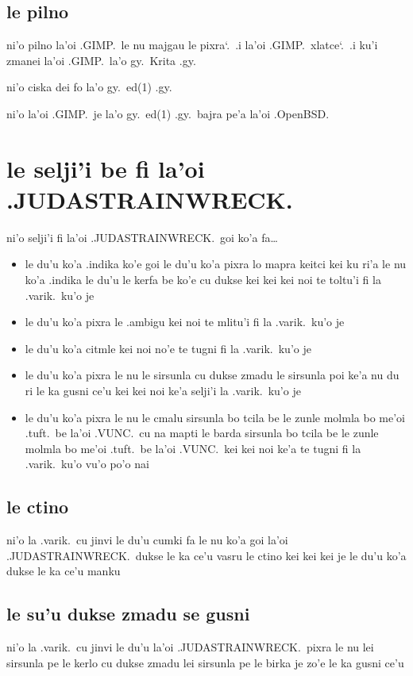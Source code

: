 \documentclass{report}
\newcommand\sds{\spacefactor\sfcode`.\ \space}
\begin{document}
\subsection{le pilno}
ni'o pilno la'oi .GIMP.\ le nu majgau le pixra\sds  .i  la'oi .GIMP.\ xlatce\sds  .i ku'i zmanei la'oi .GIMP.\ la'o gy.\ Krita  .gy.

ni'o ciska dei fo la'o gy.\ ed(1) .gy.

ni'o la'oi .GIMP.\ je la'o gy.\ ed(1) .gy.\ bajra pe'a la'oi .OpenBSD.

\section{le selji'i be fi la'oi .JUDASTRAINWRECK.}
ni'o selji'i fi la'oi .JUDASTRAINWRECK.\ goi ko'a fa\ldots
\begin{itemize}
	\item le du'u ko'a .indika ko'e goi le du'u ko'a pixra lo mapra keitci kei ku ri'a le nu ko'a .indika le du'u le kerfa be ko'e cu dukse kei kei kei noi te toltu'i fi la .varik.\ ku'o je
	\item le du'u ko'a pixra le .ambigu kei noi te mlitu'i fi la .varik.\ ku'o je
	\item le du'u ko'a citmle kei noi no'e te tugni fi la .varik.\ ku'o je
	\item le du'u ko'a pixra le nu le sirsunla cu dukse zmadu le sirsunla poi ke'a nu du ri le ka gusni ce'u kei kei noi ke'a selji'i la .varik.\ ku'o je
	\item le du'u ko'a pixra le nu le cmalu sirsunla bo tcila be le zunle molmla bo me'oi .tuft.\ be la'oi .VUNC.\ cu na mapti le barda sirsunla bo tcila be le zunle molmla bo me'oi .tuft.\ be la'oi .VUNC.\ kei kei noi ke'a te tugni fi la .varik.\ ku'o
vu'o po'o nai
\end{itemize}

\subsection{le ctino}
ni'o la .varik.\ cu jinvi le du'u cumki fa le nu ko'a goi la'oi .JUDASTRAINWRECK.\ dukse le ka ce'u vasru le ctino kei kei kei je le du'u ko'a dukse le ka ce'u manku

\subsection{le su'u dukse zmadu se gusni}
ni'o la .varik.\ cu jinvi le du'u la'oi .JUDASTRAINWRECK.\ pixra le nu lei sirsunla pe le kerlo cu dukse zmadu lei sirsunla pe le birka je zo'e le ka gusni ce'u
\end{document}
